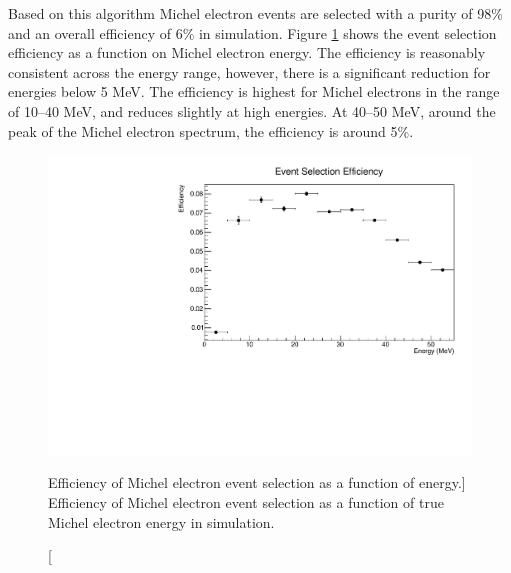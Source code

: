 Based on this algorithm Michel electron events are selected with a
purity of 98\% and an overall efficiency of 6\% in \protodune{} simulation. 
Figure \ref{fig:ev_sel_eff} shows the event selection efficiency as a 
function on Michel electron energy. The efficiency is reasonably consistent
across the energy range, however, there is a significant reduction for energies
below 5 MeV. The efficiency is highest for Michel electrons in the range of 
10--40 MeV, and reduces slightly at high energies. At 40--50 MeV, around the 
peak of the Michel electron spectrum, the efficiency is around 5\%.
\begin{figure}
	\centering
	\includegraphics[width=\textwidth, height=0.68\textwidth]{figures/eff_v_energy.pdf}
	\caption
	[Efficiency of Michel electron event selection as a function of energy.]
	{Efficiency of Michel electron event selection as a function of true Michel
	electron energy in \protodune{} simulation.}
	\label{fig:ev_sel_eff}
\end{figure}

